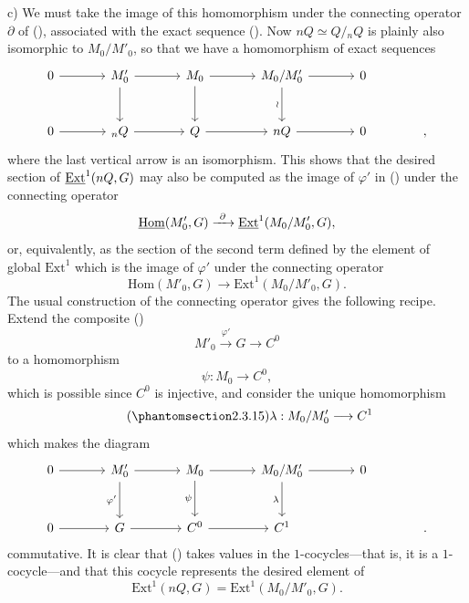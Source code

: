 
\medskip
\noindent c) We must take the image of this homomorphism under the
connecting operator $\partial$ of (), associated with the exact
sequence ().  Now $nQ\simeq Q/{}_nQ$ is plainly also isomorphic
to $M_0/M'_0$, so that we have a homomorphism of exact sequences
\[
\begin{tikzcd}[column sep=large,row sep=large]
 0\arrow[r]&M'_0\arrow[r]\arrow[d]&M_0\arrow[r]\arrow[d]
   &M_0/M'_0\arrow[r]\arrow[d,"\wr"']&0\\
 0\arrow[r]&{}_nQ\arrow[r]&Q\arrow[r]&nQ\arrow[r]&0&{,}
\end{tikzcd}
\]
where the last vertical arrow is an isomorphism.  This shows that the
desired section of $\uExt^1(nQ,G)$ may also be computed as the image
of $\varphi'$ in () under the connecting operator
\[
 \uHom(M'_0,G)\xrightarrow{\ \partial\ }
 \uExt^1(M_0/M'_0,G),
\]
or, equivalently, as the section of the second term defined by the
element of global $\mathrm{Ext}^1$ which is the image of $\varphi'$
under the connecting operator
\[
 \mathrm{Hom}(M'_0,G)\longrightarrow
 \mathrm{Ext}^1(M_0/M'_0,G).
\]
The usual construction of the connecting operator gives the following
recipe.  Extend the composite ()
\[
 M'_0\xrightarrow{\ \varphi'\ }G\longrightarrow C^0
\]
to a homomorphism
\[
 \psi:M_0\longrightarrow C^0,
\]
which is possible since $C^0$ is injective, and consider the unique
homomorphism
\begin{equation}\tag{\SGARefTarget{sga7.sga7i.eviii.n2-3-15}{2.3.15}}
 \lambda:M_0/M'_0\longrightarrow C^1
\end{equation}
which makes the diagram
\[
\begin{tikzcd}[column sep=large,row sep=large]
 0\arrow[r]&M'_0\arrow[r]\arrow[d,"\varphi'"']
   &M_0\arrow[r]\arrow[d,"\psi"']
   &M_0/M'_0\arrow[r]\arrow[d,"\lambda"']&0\\
 0\arrow[r]&G\arrow[r]&C^0\arrow[r]&C^1&&{.}
\end{tikzcd}
\]
commutative.  It is clear that () takes values in the
$1$-cocycles---that is, it is a $1$-cocycle---and that this cocycle
represents the desired element of
\[
 \mathrm{Ext}^1(nQ,G)=\mathrm{Ext}^1(M_0/M'_0,G).
\]

